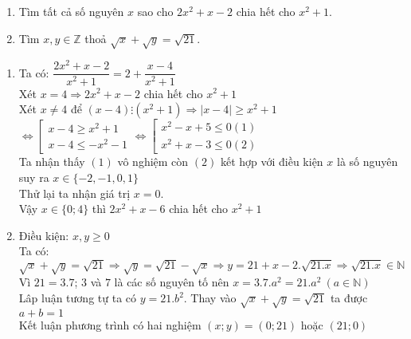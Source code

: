 \begin{ex}%
    \hfill
    \begin{enumerate}
        \item Tìm tất cả số nguyên $x$ sao cho $2x^2 + x - 2$ chia hết cho $x^2 + 1$.
        \item Tìm $x,y\in \mathbb{Z}$ thoả $\sqrt x  + \sqrt y  = \sqrt {21} $.
    \end{enumerate}
\loigiai
    {

    \begin{enumerate}
        \item Ta có: $\dfrac{{2{x^2} + x - 2}}{{{x^2} + 1}} = 2 + \dfrac{{x - 4}}{{{x^2} + 1}}$\\
            Xét $x=4\Rightarrow 2x^2+x-2$ chia hết cho $x^2+1$\\
            Xét $x\neq 4$ để $(x-4)\vdots (x^2+1)\Rightarrow |x-4|\geq x^2+1$\\
            $ \Leftrightarrow \left[ {\begin{array}{*{20}{c}}
{x - 4 \ge {x^2} + 1}\\
{x - 4 \le  - {x^2} - 1}
\end{array}} \right. \Leftrightarrow \left[ {\begin{array}{*{20}{c}}
{{x^2} - x + 5 \le 0\left( 1 \right)}\\
{{x^2} + x - 3 \le 0\left( 2 \right)}
\end{array}} \right.$\\
Ta nhận thấy $(1)$ vô nghiệm còn $(2)$ kết hợp với điều kiện $x$ là số nguyên suy ra $x\in \{-2,-1,0,1\}$\\
Thử lại ta nhận giá trị $x=0$.\\
Vậy $x\in \{0;4\}$ thì $2x^2+x-6$ chia hết cho $x^2+1$
        \item Điều kiện: $x,y\geq 0$\\
        Ta có: $\sqrt x  + \sqrt y  = \sqrt {21} \Rightarrow\sqrt y  = \sqrt {21}  - \sqrt x  \Rightarrow y = 21 + x - 2.\sqrt {21.x} \Rightarrow \sqrt {21.x}  \in\mathbb{N} $\\
        Vì $21=3.7$; $3$ và $7$ là các số nguyên tố nên $x=3.7.a^2=21.a^2~(a\in \mathbb{N})$\\
        Lâp luận tương tự ta có $y=21.b^2$. Thay vào  $\sqrt x  + \sqrt y  = \sqrt {21}$ ta được $a+b=1$\\
        Kết luận phương trình có hai nghiệm $(x;y)=(0;21)$ hoặc $(21;0)$
    \end{enumerate}
    }
\end{ex}

